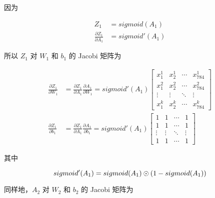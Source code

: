 \documentclass[12pt,a4paper]{amsart}
\begin{document}
因为

\begin{equation}
	\begin{aligned}
		Z_1                               & = sigmoid(A_1)  \\
		\frac{\partial Z_1}{\partial A_1} & = sigmoid'(A_1)
	\end{aligned}
\end{equation}

所以 $Z_1$ 对 $W_1$ 和 $b_1$ 的 Jacobi 矩阵为

\begin{equation}
	\begin{aligned}
		\frac{\partial Z_1}{\partial W_1} & = \frac{\partial Z_1}{\partial A_1} \frac{\partial A_1}{\partial W_1} = sigmoid'(A_1) \begin{bmatrix}
			x_1^1  & x_2^1  & \cdots & x_{784}^1 \\
			x_1^2  & x_2^2  & \cdots & x_{784}^2 \\
			\vdots & \vdots & \ddots & \vdots    \\
			x_1^k  & x_2^k  & \cdots & x_{784}^k
		\end{bmatrix} \\
		\frac{\partial Z_1}{\partial b_1} & = \frac{\partial Z_1}{\partial A_1} \frac{\partial A_1}{\partial b_1} = sigmoid'(A_1) \begin{bmatrix}
			1      & 1      & \cdots & 1      \\
			1      & 1      & \cdots & 1      \\
			\vdots & \vdots & \ddots & \vdots \\
			1      & 1      & \cdots & 1
		\end{bmatrix}
	\end{aligned}
\end{equation}

其中

\begin{equation}
	sigmoid'(A_1) = sigmoid(A_1) \odot (1 - sigmoid(A_1)) \\
\end{equation}

同样地，$A_2$ 对 $W_2$ 和 $b_2$ 的 Jacobi 矩阵为
\end{document}

